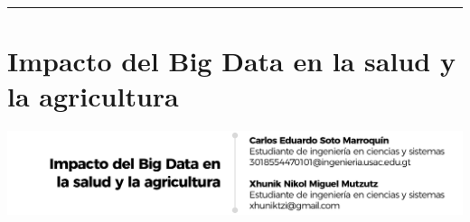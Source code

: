 \documentclass[12pt,spanish,Letterpaper,openany]{book}
\newcommand{\HRule}{\begin{center}\rule{0.5\linewidth}{0.2mm}\end{center}}
\begin{document}
\medskip

\HRule

\medskip

\hypertarget{pareja40}{%
\chapter{Impacto del Big Data en la salud y la agricultura}\label{pareja40}}

\begin{center}\includegraphics[width=1\linewidth]{autores/pareja40_01} \end{center}
\end{document}
